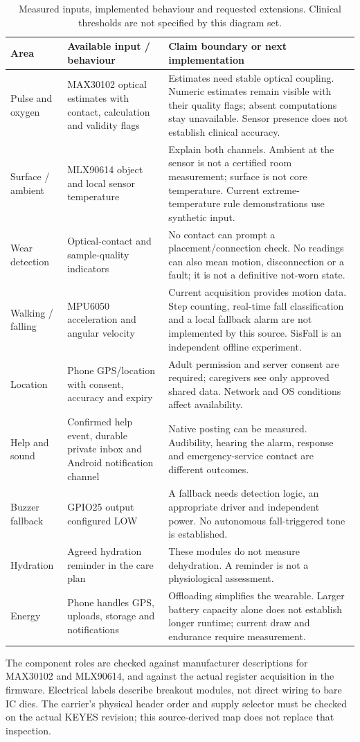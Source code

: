 \begin{table}[H]\small
\caption{Measured inputs, implemented behaviour and requested extensions. Clinical thresholds are not specified by this diagram set.}\label{tab:current-capabilities}
\begin{tabularx}{\textwidth}{@{}P{29mm}P{47mm}Y@{}}\toprule
Area & Available input / behaviour & Claim boundary or next implementation\\\midrule
Pulse and oxygen & MAX30102 optical estimates with contact, calculation and validity flags & Estimates need stable optical coupling. Numeric estimates remain visible with their quality flags; absent computations stay unavailable. Sensor presence does not establish clinical accuracy.\\
Surface / ambient & MLX90614 object and local sensor temperature & Explain both channels. Ambient at the sensor is not a certified room measurement; surface is not core temperature. Current extreme-temperature rule demonstrations use synthetic input.\\
Wear detection & Optical-contact and sample-quality indicators & No contact can prompt a placement/connection check. No readings can also mean motion, disconnection or a fault; it is not a definitive not-worn state.\\
Walking / falling & MPU6050 acceleration and angular velocity & Current acquisition provides motion data. Step counting, real-time fall classification and a local fallback alarm are not implemented by this source. SisFall is an independent offline experiment.\\
Location & Phone GPS/location with consent, accuracy and expiry & Adult permission and server consent are required; caregivers see only approved shared data. Network and OS conditions affect availability.\\
Help and sound & Confirmed help event, durable private inbox and Android notification channel & Native posting can be measured. Audibility, hearing the alarm, response and emergency-service contact are different outcomes.\\
Buzzer fallback & GPIO25 output configured LOW & A fallback needs detection logic, an appropriate driver and independent power. No autonomous fall-triggered tone is established.\\
Hydration & Agreed hydration reminder in the care plan & These modules do not measure dehydration. A reminder is not a physiological assessment.\\
Energy & Phone handles GPS, uploads, storage and notifications & Offloading simplifies the wearable. Larger battery capacity alone does not establish longer runtime; current draw and endurance require measurement.\\\bottomrule
\end{tabularx}
\end{table}

The component roles are checked against manufacturer descriptions for MAX30102 and MLX90614, and against the actual register acquisition in the firmware.\cite{maxdatasheet,mlxproduct} Electrical labels describe breakout modules, not direct wiring to bare IC dies. The carrier's physical header order and supply selector must be checked on the actual KEYES revision; this source-derived map does not replace that inspection.
